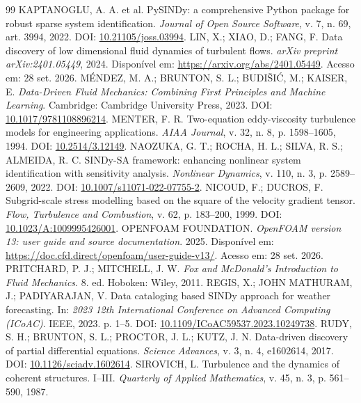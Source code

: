 \documentclass[12pt,a4paper]{article}
\begin{document}
\begin{thebibliography}{99}
 KAPTANOGLU, A. A. et al. PySINDy: a comprehensive Python package for robust sparse system identification. \textit{Journal of Open Source Software}, v. 7, n. 69, art. 3994, 2022. DOI: \href{https://doi.org/10.21105/joss.03994}{10.21105/joss.03994}.
 LIN, X.; XIAO, D.; FANG, F. Data discovery of low dimensional fluid dynamics of turbulent flows. \textit{arXiv preprint arXiv:2401.05449}, 2024. Disponível em: \url{https://arxiv.org/abs/2401.05449}. Acesso em: 28 set. 2026.
 MÉNDEZ, M. A.; BRUNTON, S. L.; BUDIŠIĆ, M.; KAISER, E. \textit{Data-Driven Fluid Mechanics: Combining First Principles and Machine Learning}. Cambridge: Cambridge University Press, 2023. DOI: \href{https://doi.org/10.1017/9781108896214}{10.1017/9781108896214}.
 MENTER, F. R. Two-equation eddy-viscosity turbulence models for engineering applications. \textit{AIAA Journal}, v. 32, n. 8, p. 1598--1605, 1994. DOI: \href{https://doi.org/10.2514/3.12149}{10.2514/3.12149}.
 NAOZUKA, G. T.; ROCHA, H. L.; SILVA, R. S.; ALMEIDA, R. C. SINDy-SA framework: enhancing nonlinear system identification with sensitivity analysis. \textit{Nonlinear Dynamics}, v. 110, n. 3, p. 2589--2609, 2022. DOI: \href{https://doi.org/10.1007/s11071-022-07755-2}{10.1007/s11071-022-07755-2}.
 NICOUD, F.; DUCROS, F. Subgrid-scale stress modelling based on the square of the velocity gradient tensor. \textit{Flow, Turbulence and Combustion}, v. 62, p. 183--200, 1999. DOI: \href{https://doi.org/10.1023/A:1009995426001}{10.1023/A:1009995426001}.
 OPENFOAM FOUNDATION. \textit{OpenFOAM version 13: user guide and source documentation}. 2025. Disponível em: \url{https://doc.cfd.direct/openfoam/user-guide-v13/}. Acesso em: 28 set. 2026.
 PRITCHARD, P. J.; MITCHELL, J. W. \textit{Fox and McDonald's Introduction to Fluid Mechanics}. 8. ed. Hoboken: Wiley, 2011.
 REGIS, X.; JOHN MATHURAM, J.; PADIYARAJAN, V. Data cataloging based SINDy approach for weather forecasting. In: \textit{2023 12th International Conference on Advanced Computing (ICoAC)}. IEEE, 2023. p. 1--5. DOI: \href{https://doi.org/10.1109/ICoAC59537.2023.10249738}{10.1109/ICoAC59537.2023.10249738}.
 RUDY, S. H.; BRUNTON, S. L.; PROCTOR, J. L.; KUTZ, J. N. Data-driven discovery of partial differential equations. \textit{Science Advances}, v. 3, n. 4, e1602614, 2017. DOI: \href{https://doi.org/10.1126/sciadv.1602614}{10.1126/sciadv.1602614}.
 SIROVICH, L. Turbulence and the dynamics of coherent structures. I--III. \textit{Quarterly of Applied Mathematics}, v. 45, n. 3, p. 561--590, 1987.

\end{thebibliography}
\end{document}
